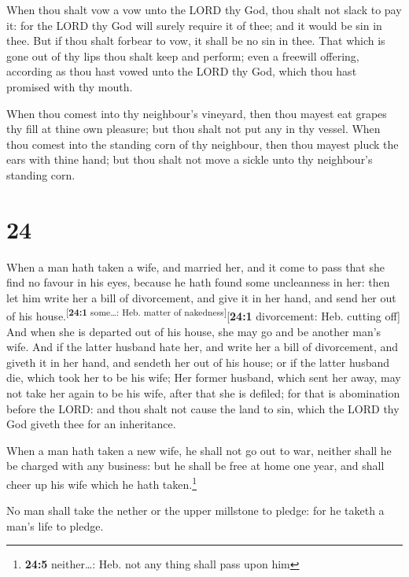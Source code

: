  When thou shalt vow a vow unto the LORD thy God, thou
shalt not slack to pay it: for the LORD thy God will surely require it
of thee; and it would be sin in thee.  But if thou shalt
forbear to vow, it shall be no sin in thee.  That which
is gone out of thy lips thou shalt keep and perform; even a freewill
offering, according as thou hast vowed unto the LORD thy God, which thou
hast promised with thy mouth.

 When thou comest into thy neighbour's vineyard, then
thou mayest eat grapes thy fill at thine own pleasure; but thou shalt
not put any in thy vessel.  When thou comest into the
standing corn of thy neighbour, then thou mayest pluck the ears with
thine hand; but thou shalt not move a sickle unto thy neighbour's
standing corn.

\hypertarget{section-23}{%
\section{24}\label{section-23}}

 When a man hath taken a wife, and married her, and it
come to pass that she find no favour in his eyes, because he hath found
some uncleanness in her: then let him write her a bill of divorcement,
and give it in her hand, and send her out of his
house.\textsuperscript{{[}\textbf{24:1} some\ldots: Heb. matter of
nakedness{]}}{[}\textbf{24:1} divorcement: Heb. cutting off{]}
 And when she is departed out of his house, she may go and
be another man's wife.  And if the latter husband hate
her, and write her a bill of divorcement, and giveth it in her hand, and
sendeth her out of his house; or if the latter husband die, which took
her to be his wife;  Her former husband, which sent her
away, may not take her again to be his wife, after that she is defiled;
for that is abomination before the LORD: and thou shalt not cause the
land to sin, which the LORD thy God giveth thee for an inheritance.

 When a man hath taken a new wife, he shall not go out to
war, neither shall he be charged with any business: but he shall be free
at home one year, and shall cheer up his wife which he hath
taken.\footnote{\textbf{24:5} neither\ldots: Heb. not any thing shall
  pass upon him}

 No man shall take the nether or the upper millstone to
pledge: for he taketh a man's life to pledge.

